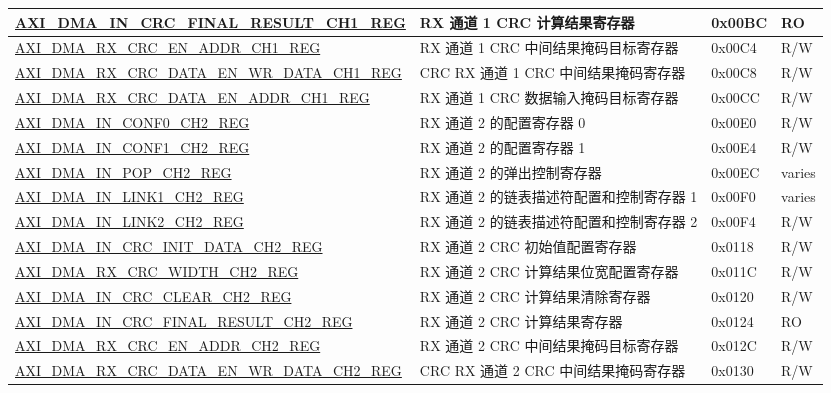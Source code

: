 \begin{longtable}{ | l | l | p{1.3cm} | l | }
\hyperref[regdesc:AXIDMAINCRCFINALRESULTCHNREG]{AXI\_DMA\_IN\_CRC\_FINAL\_RESULT\_CH1\_REG} & RX 通道 1 CRC 计算结果寄存器 & 0x00BC & RO \\ \hline
\hyperref[regdesc:AXIDMARXCRCENADDRCHNREG]{AXI\_DMA\_RX\_CRC\_EN\_ADDR\_CH1\_REG} & RX 通道 1 CRC 中间结果掩码目标寄存器 & 0x00C4 & R/W \\ \hline
\hyperref[regdesc:AXIDMARXCRCDATAENWRDATACHNREG]{AXI\_DMA\_RX\_CRC\_DATA\_EN\_WR\_DATA\_CH1\_REG} & CRC RX 通道 1 CRC 中间结果掩码寄存器 & 0x00C8 & R/W \\ \hline
\hyperref[regdesc:AXIDMARXCRCDATAENADDRCHNREG]{AXI\_DMA\_RX\_CRC\_DATA\_EN\_ADDR\_CH1\_REG} & RX 通道 1 CRC 数据输入掩码目标寄存器 & 0x00CC & R/W \\ \hline
\hyperref[regdesc:AXIDMAINCONF0CHNREG]{AXI\_DMA\_IN\_CONF0\_CH2\_REG} & RX 通道 2 的配置寄存器 0 & 0x00E0 & R/W \\ \hline
\hyperref[regdesc:AXIDMAINCONF1CHNREG]{AXI\_DMA\_IN\_CONF1\_CH2\_REG} & RX 通道 2 的配置寄存器 1 & 0x00E4 & R/W \\ \hline
\hyperref[regdesc:AXIDMAINPOPCHNREG]{AXI\_DMA\_IN\_POP\_CH2\_REG} & RX 通道 2 的弹出控制寄存器 & 0x00EC & varies \\ \hline
\hyperref[regdesc:AXIDMAINLINK1CHNREG]{AXI\_DMA\_IN\_LINK1\_CH2\_REG} & RX 通道 2 的链表描述符配置和控制寄存器 1 & 0x00F0 & varies \\ \hline
\hyperref[regdesc:AXIDMAINLINK2CHNREG]{AXI\_DMA\_IN\_LINK2\_CH2\_REG} & RX 通道 2 的链表描述符配置和控制寄存器 2 & 0x00F4 & R/W \\ \hline
\hyperref[regdesc:AXIDMAINCRCINITDATACHNREG]{AXI\_DMA\_IN\_CRC\_INIT\_DATA\_CH2\_REG} & RX 通道 2 CRC 初始值配置寄存器 & 0x0118 & R/W \\ \hline
\hyperref[regdesc:AXIDMARXCRCWIDTHCHNREG]{AXI\_DMA\_RX\_CRC\_WIDTH\_CH2\_REG} & RX 通道 2 CRC 计算结果位宽配置寄存器 & 0x011C & R/W \\ \hline
\hyperref[regdesc:AXIDMAINCRCCLEARCHNREG]{AXI\_DMA\_IN\_CRC\_CLEAR\_CH2\_REG} & RX 通道 2 CRC 计算结果清除寄存器 & 0x0120 & R/W \\ \hline
\hyperref[regdesc:AXIDMAINCRCFINALRESULTCHNREG]{AXI\_DMA\_IN\_CRC\_FINAL\_RESULT\_CH2\_REG} & RX 通道 2 CRC 计算结果寄存器 & 0x0124 & RO \\ \hline
\hyperref[regdesc:AXIDMARXCRCENADDRCHNREG]{AXI\_DMA\_RX\_CRC\_EN\_ADDR\_CH2\_REG} & RX 通道 2 CRC 中间结果掩码目标寄存器 & 0x012C & R/W \\ \hline
\hyperref[regdesc:AXIDMARXCRCDATAENWRDATACHNREG]{AXI\_DMA\_RX\_CRC\_DATA\_EN\_WR\_DATA\_CH2\_REG} & CRC RX 通道 2 CRC 中间结果掩码寄存器 & 0x0130 & R/W \\ \hline

\end{longtable}
